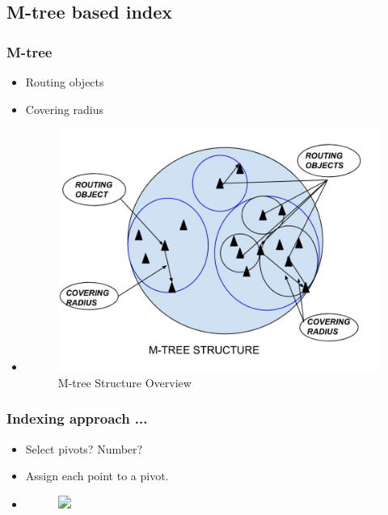 \documentclass{beamer}
\begin{document}
\subsection{M-tree based index}

\begin{frame}
\frametitle{M-tree}
\begin{overlayarea}{\textwidth}{.8\textheight}

\begin{itemize}
	\item<1-> Routing objects 
	\item<1-> Covering radius
	
\item<2->[]
\begin{figure}[ht]	
\centering
\includegraphics[width=0.55 \columnwidth]{img/mtree.jpg}
\caption{M-tree Structure Overview}
\end{figure}
	
\end{itemize}
\end{overlayarea}
\end{frame}

\begin{frame}
\frametitle{Indexing approach ...}
\begin{overlayarea}{\textwidth}{.8\textheight}
\begin{itemize}
	\item<1-> Select pivots? Number?
	\item<2-> Assign each point to a pivot.
	\item<3->[]	
\begin{figure}[ht]	
\centering
\includegraphics<3->[width=0.5 \columnwidth]{img/image0a.jpg}
\end{figure}

\end{itemize}
\end{overlayarea}	
\end{frame}
\end{document}
